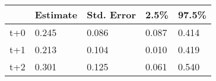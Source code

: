 \begin{tabular}{lllll}
  \toprule
  & Estimate & Std. Error & 2.5\% & 97.5\% \\ 
  \midrule
t+0 & 0.245 & 0.086 & 0.087 & 0.414 \\ 
  t+1 & 0.213 & 0.104 & 0.010 & 0.419 \\ 
  t+2 & 0.301 & 0.125 & 0.061 & 0.540 \\ 
   \bottomrule
\end{tabular}
